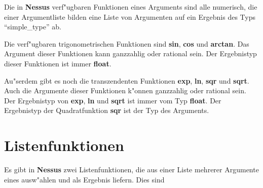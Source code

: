 Die in {\bf Nessus} verf"ugbaren Funktionen eines Arguments sind alle
numerisch, die einer Argumentliste bilden eine Liste von Argumenten
auf ein Ergebnis des Typs ``simple\_type'' ab.

\begin{center}
\end{center}

Die verf"ugbaren trigonometrischen Funktionen sind {\bf sin}, {\bf
cos} und {\bf arctan}.  Das Argument dieser Funktionen kann
ganzzahlig oder rational sein.
Der Ergebnistyp dieser Funktionen  ist immer
{\bf float}.

Au"serdem gibt es noch die transzendenten Funktionen {\bf exp}, {\bf
ln}, {\bf sqr} und {\bf sqrt}. Auch die Argumente dieser Funktionen
k"onnen ganzzahlig oder rational sein.  Der Ergebnistyp von {\bf exp},
{\bf ln} und {\bf sqrt} ist immer vom Typ {\bf
float}. Der Ergebnistyp der Quadratfunktion {\bf
sqr} ist der Typ des Arguments.


\section{Listenfunktionen}

Es gibt in {\bf Nessus} zwei  Listenfunktionen, die aus einer Liste
mehrerer Argumente eines ausw"ahlen und als Ergebnis liefern. Dies sind

